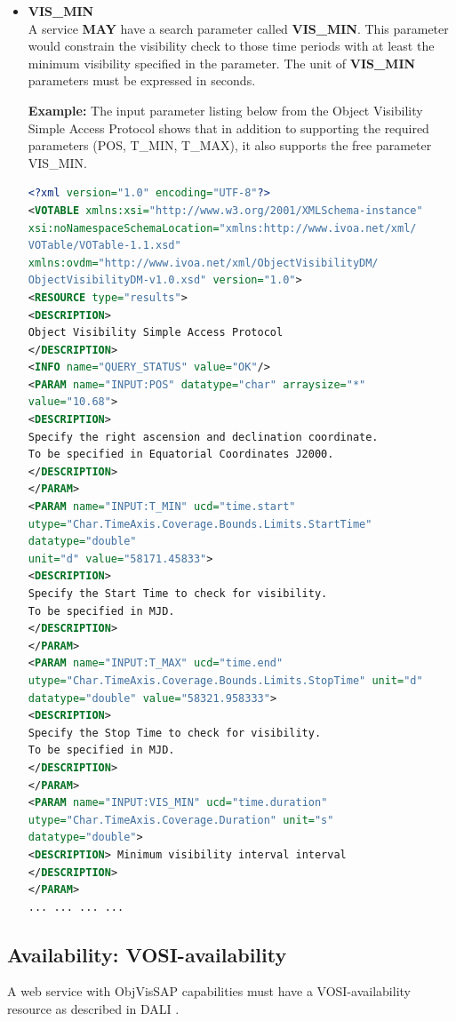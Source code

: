 \documentclass[11pt,a4paper]{ivoa}
\begin{document}
\begin{itemize}
\item{\textbf{VIS\_MIN}\\A service \textbf{MAY} have a search parameter
called \textbf{VIS\_MIN}. This parameter would constrain the visibility
check to those time periods with at least the minimum visibility specified
in the parameter. The unit of \textbf{VIS\_MIN} parameters must be expressed
in seconds.\par
\textbf{Example:} The input parameter listing below from the Object
Visibility Simple Access Protocol shows that in addition to supporting
the required parameters (POS, T\_MIN, T\_MAX), it also supports the free
parameter VIS\_MIN.
\begin{lstlisting}[language=XML]
<?xml version="1.0" encoding="UTF-8"?>
<VOTABLE xmlns:xsi="http://www.w3.org/2001/XMLSchema-instance"
xsi:noNamespaceSchemaLocation="xmlns:http://www.ivoa.net/xml/
VOTable/VOTable-1.1.xsd"
xmlns:ovdm="http://www.ivoa.net/xml/ObjectVisibilityDM/
ObjectVisibilityDM-v1.0.xsd" version="1.0">
<RESOURCE type="results">
<DESCRIPTION>
Object Visibility Simple Access Protocol
</DESCRIPTION>
<INFO name="QUERY_STATUS" value="OK"/>
<PARAM name="INPUT:POS" datatype="char" arraysize="*"
value="10.68">
<DESCRIPTION>
Specify the right ascension and declination coordinate.
To be specified in Equatorial Coordinates J2000.
</DESCRIPTION>
</PARAM>
<PARAM name="INPUT:T_MIN" ucd="time.start"
utype="Char.TimeAxis.Coverage.Bounds.Limits.StartTime"
datatype="double"
unit="d" value="58171.45833">
<DESCRIPTION>
Specify the Start Time to check for visibility.
To be specified in MJD.
</DESCRIPTION>
</PARAM>
<PARAM name="INPUT:T_MAX" ucd="time.end"
utype="Char.TimeAxis.Coverage.Bounds.Limits.StopTime" unit="d"
datatype="double" value="58321.958333">
<DESCRIPTION>
Specify the Stop Time to check for visibility.
To be specified in MJD.
</DESCRIPTION>
</PARAM>
<PARAM name="INPUT:VIS_MIN" ucd="time.duration"
utype="Char.TimeAxis.Coverage.Duration" unit="s"
datatype="double">
<DESCRIPTION> Minimum visibility interval interval
</DESCRIPTION>
</PARAM>
... ... ... ...
\end{lstlisting}

}
\end{itemize}

\subsection{Availability: VOSI-availability}
A web service with ObjVisSAP capabilities  \citep{2017ivoa.spec.0524G} must have a
VOSI-availability resource as described in DALI \citep{2017ivoa.spec.0517D}.
\end{document}
